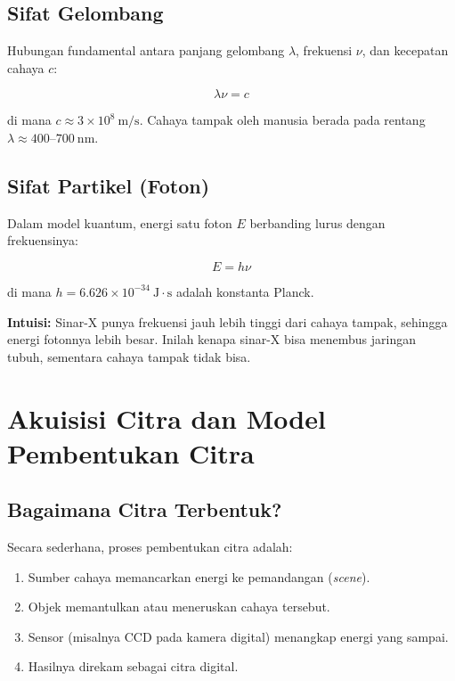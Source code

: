 \documentclass[12pt,a4paper]{article}
\begin{document}
\subsection{Sifat Gelombang}
 
Hubungan fundamental antara panjang gelombang $\lambda$, frekuensi $\nu$, dan kecepatan
cahaya $c$:
 
\begin{equation}
  \lambda \nu = c
  \label{eq:wave}
\end{equation}
 
di mana $c \approx 3 \times 10^8\ \text{m/s}$. Cahaya tampak oleh manusia berada pada
rentang $\lambda \approx 400\text{--}700\ \text{nm}$.
 
\subsection{Sifat Partikel (Foton)}
 
Dalam model kuantum, energi satu foton $E$ berbanding lurus dengan frekuensinya:
 
\begin{equation}
  E = h\nu
  \label{eq:photon}
\end{equation}
 
di mana $h = 6.626 \times 10^{-34}\ \text{J}\cdot\text{s}$ adalah konstanta Planck.
 
\begin{notebox}
  \textbf{Intuisi:} Sinar-X punya frekuensi jauh lebih tinggi dari cahaya tampak, sehingga
  energi fotonnya lebih besar. Inilah kenapa sinar-X bisa menembus jaringan tubuh, sementara
  cahaya tampak tidak bisa.
\end{notebox}
 
\section{Akuisisi Citra dan Model Pembentukan Citra}
\label{sec:akuisisi}
 
\subsection{Bagaimana Citra Terbentuk?}
 
Secara sederhana, proses pembentukan citra adalah:
\begin{enumerate}
  \item Sumber cahaya memancarkan energi ke pemandangan (\textit{scene}).
  \item Objek memantulkan atau meneruskan cahaya tersebut.
  \item Sensor (misalnya CCD pada kamera digital) menangkap energi yang sampai.
  \item Hasilnya direkam sebagai citra digital.
\end{enumerate}
 
\end{document}
